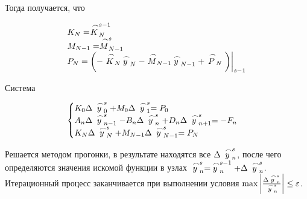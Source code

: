 \begin{enumerate}
    Тогда получается, что

    \begin{equation*}
        \begin{matrix*}[l]
            K_N = \LittleCap{K}_N^{s-1} \\
            M_{N-1} = \LittleCap{M}_{N-1}^s \\
            P_N = \bigg( -\LittleCap{K}_N \LittleCap{y}_N - \LittleCap{M}_{N-1} \LittleCap{y}_{N-1} + \LittleCap{P}_N \bigg) \bigg|_{s-1}\\
        \end{matrix*}
    \end{equation*}

    Система

    \begin{equation*}
        \begin{cases}
            K_0 \Delta \LittleCap{y}_0^s + M_0 \Delta \LittleCap{y}_1^s = P_0 \\
            A_n \Delta \LittleCap{y}_{n-1}^s - B_n \Delta\LittleCap{y}_n^s + D_n \Delta \LittleCap{y}_{n+1}^s = -F_n \\
            K_N \Delta \LittleCap{y}_N^s + M_{N-1} \Delta \LittleCap{y}_{N-1}^s = P_N \\
        \end{cases}
    \end{equation*}

    Решается методом прогонки, в результате находятся все $\Delta \LittleCap{y}_n^s$, после чего определяются значения искомой функции в узлах $\LittleCap{y}_n^s = \LittleCap{y}_n^{s-1} + \Delta \LittleCap{y}_n^s$. Итерационный процесс заканчивается при выполнении условия $\max \bigg| \frac{\Delta \LittleCap{y}_n^s}{\LittleCap{y}_n^s} \bigg| \le \varepsilon$.

\end{enumerate}
